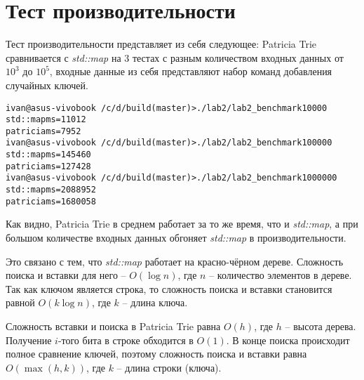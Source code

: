 \section{Тест производительности}

Тест производительности представляет из себя следующее: 
Patricia Trie сравнивается с \textit{std::map} на 3 тестах с разным количеством входных данных от $10^3$ до $10^5$, 
входные данные из себя представляют набор команд добавления случайных ключей.

\begin{alltt}
ivan@asus-vivobook ~/c/d/build (master)> ./lab2/lab2_benchmark 10000
std::map ms=11012
patricia ms=7952
ivan@asus-vivobook ~/c/d/build (master)> ./lab2/lab2_benchmark 100000
std::map ms=145460
patricia ms=127428
ivan@asus-vivobook ~/c/d/build (master)> ./lab2/lab2_benchmark 1000000
std::map ms=2088952
patricia ms=1680058
\end{alltt}

Как видно, Patricia Trie в среднем работает за то же время, что и \textit{std::map}, а при большом количестве входных
данных обгоняет \textit{std::map} в производительности.

Это связано с тем, что \textit{std::map} работает
на красно-чёрном дереве. Сложность поиска и вставки для него -- $O(\log n)$, где $n$ -- количество элементов в дереве. Так как ключом
является строка, то сложность поиска и вставки становится равной $O(k \log n)$, где $k$ -- длина ключа.

Сложность вставки и поиска в Patricia Trie равна $O(h)$, где $h$ -- высота дерева. Получение $i$-того бита в строке обходится в $O(1)$. 
В конце поиска происходит полное сравнение ключей, поэтому сложность поиска и вставки равна $O(\max (h, k))$, где $k$ -- длина строки (ключа).
\pagebreak

